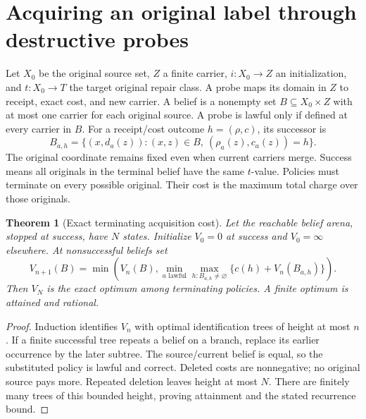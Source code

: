 \documentclass[11pt]{article}
\newtheorem{theorem}{Theorem}[section]
\theoremstyle{definition}
\begin{document}
\section{Acquiring an original label through destructive probes}
Let $X_0$ be the original source set, $Z$ a finite carrier, $i:X_0\to Z$ an
initialization, and $t:X_0\to T$ the target original repair class. A probe
maps its domain in $Z$ to receipt, exact cost, and new carrier. A belief is
a nonempty set $B\subseteq X_0\times Z$ with at most one carrier for each
original source. A probe is lawful only if defined at every carrier in $B$.
For a receipt/cost outcome $h=(\rho,c)$, its successor is
\[
 B_{a,h}=\{(x,d_a(z)):(x,z)\in B,\ (\rho_a(z),c_a(z))=h\}.
\]
The original coordinate remains fixed even when current carriers merge.
Success means all originals in the terminal belief have the same $t$-value.
Policies must terminate on every possible original. Their cost is the
maximum total charge over those originals.

\begin{theorem}[Exact terminating acquisition cost]
Let the reachable belief arena, stopped at success, have $N$ states. Initialize
$V_0=0$ at success and $V_0=\infty$ elsewhere. At nonsuccessful beliefs set
\[
 V_{n+1}(B)=\min\left(V_n(B),\min_{a\text{ lawful}}
       \max_{h:B_{a,h}\ne\varnothing}\{c(h)+V_n(B_{a,h})\}\right).
\]
Then $V_N$ is the exact optimum among terminating policies. A finite optimum
is attained and rational.
\end{theorem}
\begin{proof}
Induction identifies $V_n$ with optimal identification trees of height at most
$n$. If a finite successful tree repeats a belief on a branch, replace its
earlier occurrence by the later subtree. The source/current belief is equal,
so the substituted policy is lawful and correct. Deleted costs are
nonnegative; no original source pays more. Repeated deletion leaves height
at most $N$. There are finitely many trees of this bounded height, proving
attainment and the stated recurrence bound.
\end{proof}
\end{document}
